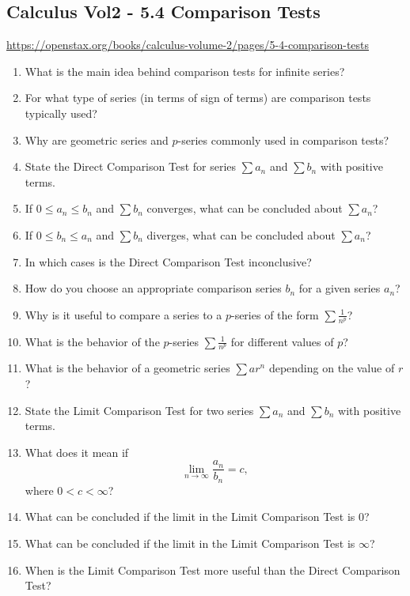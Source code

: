 \subsection{Calculus Vol2 - 5.4 Comparison Tests}

\url{https://openstax.org/books/calculus-volume-2/pages/5-4-comparison-tests}

\begin{enumerate}
  \item What is the main idea behind comparison tests for infinite series?
  \item For what type of series (in terms of sign of terms) are comparison tests typically used?
  \item Why are geometric series and \(p\)-series commonly used in comparison tests?
  \item State the Direct Comparison Test for series \(\sum a_{n}\) and \(\sum b_{n}\) with positive terms.
  \item If \(0 \le a_{n} \le b_{n}\) and \(\sum b_{n}\) converges, what can be concluded about \(\sum a_{n}\)?
  \item If \(0 \le b_{n} \le a_{n}\) and \(\sum b_{n}\) diverges, what can be concluded about \(\sum a_{n}\)?
  \item In which cases is the Direct Comparison Test inconclusive?
  \item How do you choose an appropriate comparison series \(b_{n}\) for a given series \(a_{n}\)?
  \item Why is it useful to compare a series to a \(p\)-series of the form \(\sum \frac{1}{n^{p}}\)?
  \item What is the behavior of the \(p\)-series \(\sum \frac{1}{n^{p}}\) for different values of \(p\)?
  \item What is the behavior of a geometric series \(\sum ar^{n}\) depending on the value of \(r\)?
  \item State the Limit Comparison Test for two series \(\sum a_{n}\) and \(\sum b_{n}\) with positive terms.
  \item What does it mean if
    \[ \lim_{n \to \infty}\frac{a_{n}}{b_{n}}= c, \]
    where \(0 < c < \infty\)?
  \item What can be concluded if the limit in the Limit Comparison Test is \(0\)?
  \item What can be concluded if the limit in the Limit Comparison Test is \(\infty\)?
  \item When is the Limit Comparison Test more useful than the Direct Comparison Test?

\end{enumerate}
